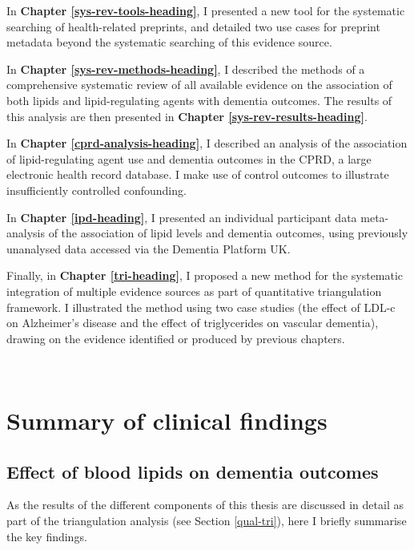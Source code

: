 \documentclass[a4paper, twoside]{templates/ociamthesis}
\begin{document}
In \textbf{Chapter \ref{sys-rev-tools-heading}}, I presented a new tool for the systematic searching of health-related preprints, and detailed two use cases for preprint metadata beyond the systematic searching of this evidence source.

In \textbf{Chapter \ref{sys-rev-methods-heading}}, I described the methods of a comprehensive systematic review of all available evidence on the association of both lipids and lipid-regulating agents with dementia outcomes. The results of this analysis are then presented in \textbf{Chapter \ref{sys-rev-results-heading}}.

In \textbf{Chapter \ref{cprd-analysis-heading}}, I described an analysis of the association of lipid-regulating agent use and dementia outcomes in the CPRD, a large electronic health record database. I make use of control outcomes to illustrate insufficiently controlled confounding.

In \textbf{Chapter \ref{ipd-heading}}, I presented an individual participant data meta-analysis of the association of lipid levels and dementia outcomes, using previously unanalysed data accessed via the Dementia Platform UK.

Finally, in \textbf{Chapter \ref{tri-heading}}, I proposed a new method for the systematic integration of multiple evidence sources as part of quantitative triangulation framework. I illustrated the method using two case studies (the effect of LDL-c on Alzheimer's disease and the effect of triglycerides on vascular dementia), drawing on the evidence identified or produced by previous chapters.

~

\hypertarget{summary-of-clinical-findings}{%
\section{Summary of clinical findings}\label{summary-of-clinical-findings}}

\hypertarget{effect-of-blood-lipids-on-dementia-outcomes}{%
\subsection{Effect of blood lipids on dementia outcomes}\label{effect-of-blood-lipids-on-dementia-outcomes}}

As the results of the different components of this thesis are discussed in detail as part of the triangulation analysis (see Section \ref{qual-tri}), here I briefly summarise the key findings.
\end{document}
